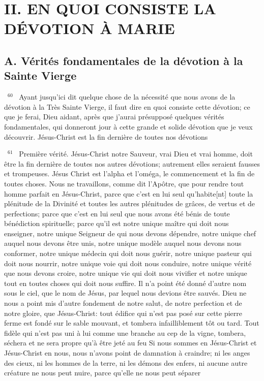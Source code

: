 \documentclass[paper=a5,pagesize=pdftex,fontsize=15pt,headinclude=on,twoside=off]{scrbook}
\newcommand{\negphantom}[1]{\settowidth{\dimen0}{#1}\hspace*{-\dimen0}}
\newcommand{\versenb}[1]{\par \vspace{10pt}~\negphantom{~${}^{#1}$~}${}^{#1}$~}
\begin{document}
\section{II. EN QUOI CONSISTE LA DÉVOTION À MARIE}
\subsection{A. Vérités fondamentales de la dévotion à la Sainte Vierge}
\versenb{60} Ayant jusqu'ici dit quelque chose de la nécessité que nous avons de la dévotion à la Très Sainte Vierge, il faut
dire en quoi consiste cette dévotion; ce que je ferai, Dieu aidant, après que j'aurai présupposé quelques vérités
fondamentales, qui donneront jour à cette grande et solide dévotion que je veux découvrir.
Jésus-Christ est la fin dernière de toutes nos dévotions
\versenb{61} Première vérité. Jésus-Christ notre Sauveur, vrai Dieu et vrai homme, doit être la fin dernière de toutes nos
autres dévotions; autrement elles seraient fausses et trompeuses. Jésus Christ est l'alpha et l'oméga, le
commencement et la fin de toutes choses. Nous ne travaillons, comme dit l'Apôtre, que pour rendre tout homme
parfait en Jésus-Christ, parce que c'est en lui seul qu'habite[nt] toute la plénitude de la Divinité et toutes les autres
plénitudes de grâces, de vertus et de perfections; parce que c'est en lui seul que nous avons été bénis de toute
bénédiction spirituelle; parce qu'il est notre unique maître qui doit nous enseigner, notre unique Seigneur de qui
nous devons dépendre, notre unique chef auquel nous devons être unis, notre unique modèle auquel nous devons
nous conformer, notre unique médecin qui doit nous guérir, notre unique pasteur qui doit nous nourrir, notre unique
voie qui doit nous conduire, notre unique vérité que nous devons croire, notre unique vie qui doit nous vivifier et
notre unique tout en toutes choses qui doit nous suffire. Il n'a point été donné d'autre nom sous le ciel, que le nom
de Jésus, par lequel nous devions être sauvés. Dieu ne nous a point mis d'autre fondement de notre salut, de
notre perfection et de notre gloire, que Jésus-Christ: tout édifice qui n'est pas posé sur cette pierre ferme est fondé
sur le sable mouvant, et tombera infailliblement tôt ou tard. Tout fidèle qui n'est pas uni à lui comme une branche
au cep de la vigne, tombera, séchera et ne sera propre qu'à être jeté au feu Si nous sommes en Jésus-Christ et
Jésus-Christ en nous, nous n'avons point de damnation à craindre; ni les anges des cieux, ni les hommes de la
terre, ni les démons des enfers, ni aucune autre créature ne nous peut nuire, parce qu'elle ne nous peut séparer
\end{document}
